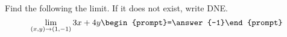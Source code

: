 \documentclass{ximera}
\author{David Guichard \and Neal Koblitz \and H. Jerome Keisler \and Albert Scheller \and Barry Balof \and Mike Wills \and Matthew Carr}
\begin{document}
\begin{exercise}




Find the following the limit. If it does not exist, write DNE. 
\[
\lim_{(x,y)\to (1,-1)}3x+4y\begin{prompt}=\answer{-1}\end{prompt}
\]

\end{exercise}
\end{document}
